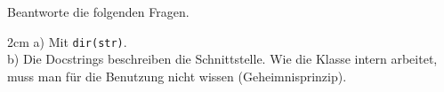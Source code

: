 \question[2]
Beantworte die folgenden Fragen.
\begin{solutionbox}{2cm}
a) Mit \texttt{dir(str)}. \\
b) Die Docstrings beschreiben die Schnittstelle. Wie die Klasse intern arbeitet, muss man für die Benutzung nicht wissen (Geheimnisprinzip).
\end{solutionbox}
